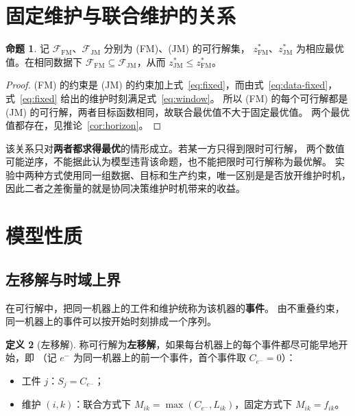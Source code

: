 \documentclass[11pt,oneside,notitlepage]{ctexrep}
\theoremstyle{definition}
\newtheorem{definition}{定义}[chapter]
\newtheorem{proposition}[definition]{命题}
\theoremstyle{remark}
\begin{document}
\section{固定维护与联合维护的关系}

\begin{proposition}\label{prop:fixed-joint}
记 $\mathcal{F}_{\mathrm{FM}}$、$\mathcal{F}_{\mathrm{JM}}$ 分别为 (FM)、(JM) 的可行解集，
$z^*_{\mathrm{FM}}$、$z^*_{\mathrm{JM}}$ 为相应最优值。在相同数据下
$\mathcal{F}_{\mathrm{FM}}\subseteq\mathcal{F}_{\mathrm{JM}}$，从而 $z^*_{\mathrm{JM}}\le z^*_{\mathrm{FM}}$。
\end{proposition}

\begin{proof}
(FM) 的约束是 (JM) 的约束加上式~\eqref{eq:fixed}，而由式~\eqref{eq:data-fixed}，
式~\eqref{eq:fixed} 给出的维护时刻满足式~\eqref{eq:window}。
所以 (FM) 的每个可行解都是 (JM) 的可行解，两者目标函数相同，故联合最优值不大于固定最优值。
两个最优值都存在，见推论~\ref{cor:horizon}。
\end{proof}

该关系只对\textbf{两者都求得最优}的情形成立。若某一方只得到限时可行解，
两个数值可能逆序，不能据此认为模型违背该命题，也不能把限时可行解称为最优解。
实验中两种方式使用同一组数据、目标和生产约束，唯一区别是是否放开维护时机，
因此二者之差衡量的就是协同决策维护时机带来的收益。

\section{模型性质}

\subsection{左移解与时域上界}

在可行解中，把同一机器上的工件和维护统称为该机器的\textbf{事件}。
由不重叠约束，同一机器上的事件可以按开始时刻排成一个序列。

\begin{definition}[左移解]\label{def:left-shift}
称可行解为\textbf{左移解}，如果每台机器上的每个事件都尽可能早地开始，即
（记 $e^-$ 为同一机器上的前一个事件，首个事件取 $C_{e^-}=0$）：
\begin{itemize}[nosep]
  \item 工件 $j$：$S_j=C_{e^-}$；
  \item 维护 $(i,k)$：联合方式下 $M_{ik}=\max(C_{e^-},L_{ik})$，固定方式下 $M_{ik}=f_{ik}$。
\end{itemize}
\end{definition}
\end{document}
